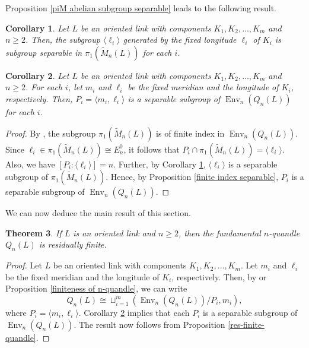 \documentclass[12pt]{amsart}
\newtheorem{theorem}{Theorem}[section]
\newtheorem{corollary}[theorem]{Corollary}
\theoremstyle{definition}
\numberwithin{equation}{subsection}
\newcommand{\Env}{\operatorname{Env}}
\begin{document}
Proposition \ref{piM abelian subgroup separable} leads to the following result.

\begin{corollary}\label{l_i is separable}
Let $L$ be an oriented link with components $K_1, K_2, \ldots, K_m$ and $n \ge 2$. Then, the subgroup $\langle \ell_i \rangle$ generated by the fixed longitude $\ell_i$ of $K_i$ is subgroup separable in $\pi_{1}(\widetilde{M}_{n}(L))$ for each $i$.
\end{corollary}

\begin{corollary}\label{m_k,l_k separable}
Let $L$ be an oriented link with components $K_1, K_2, \ldots, K_m$ and $n \ge 2$. For each $i$, let $m_i$ and $\ell_i$ be the fixed meridian and the longitude of $K_i$, respectively.  Then,  $P_i=\langle m_i, \ell_i \rangle$ is a separable subgroup of $\Env_n(Q_n(L))$ for each $i$.
\end{corollary}

\begin{proof}
By  \cite[Section 3]{MR3704243}, the subgroup $\pi_{1}(\widetilde{M}_{n}(L))$ is of finite index in $\Env_n(Q_n(L))$. Since $\ell_i \in \pi_{1}\left( \widetilde{M}_{n}(L)\right) \cong E_n^0$, it follows that $P_i \cap \pi_{1}(\widetilde{M}_{n}(L))=\langle \ell_i \rangle$.  Also, we have $[P_i : \langle \ell_i \rangle ]=n$. Further, by Corollary \ref{l_i is separable}, $\langle \ell_i \rangle$ is a separable subgroup of $\pi_{1}\left( \widetilde{M}_{n}(L)\right)$. Hence, by Proposition \ref{finite index separable}, $P_i$ is a separable subgroup of $\Env_n(Q_n(L))$.
\end{proof}

We can now deduce the main result of this section.

\begin{theorem}\label{n quandles link res finite}
If $L$ is an oriented link and $n \ge 2$, then the fundamental $n$-quandle $Q_n(L)$ is residually finite.
\end{theorem}

\begin{proof}
Let $L$ be an oriented link with components $K_1, K_2, \ldots, K_m$. Let $m_i$ and $\ell_i$ be the fixed meridian and the longitude of $K_i$, respectively. Then, by \cite[Theorem 1.1]{MR3704243} or Proposition \ref{finiteness of n-quandle}, we can write 
$$Q_n(L) \cong \sqcup_{i=1}^m (\Env_n(Q_n(L))/P_i,m_i),$$ where $P_i=\langle m_i, \ell_i \rangle$. Corollary \ref{m_k,l_k separable} implies that each $P_i$ is a separable subgroup of $\Env_n(Q_n(L))$. The result now follows from Proposition \ref{res-finite-quandle}.
\end{proof}
\end{document}
